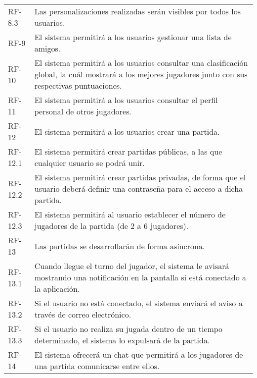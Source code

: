 \documentclass[11pt, a4paper, titlepage]{article}
\begin{document}
\begin{longtable}
\begin{tabularx}{\textwidth}{|l|X|}
         RF-8.3 & Las personalizaciones realizadas serán visibles por todos los usuarios.\\
         RF-9 & El sistema permitirá a los usuarios gestionar una lista de amigos.\\
         RF-10 & El sistema permitirá a los usuarios consultar una clasificación global, la cuál mostrará a los mejores jugadores junto con sus respectivas puntuaciones.\\
         RF-11 & El sistema permitirá a los usuarios consultar el perfil personal de otros jugadores.\\
         RF-12 & El sistema permitirá a los usuarios crear una partida.\\
         RF-12.1 & El sistema permitirá crear partidas públicas, a las que cualquier usuario se podrá unir.\\
         RF-12.2 & El sistema permitirá crear partidas privadas, de forma que el usuario deberá definir una contraseña para el acceso a dicha partida.\\
         RF-12.3 & El sistema permitirá al usuario establecer el número de jugadores de la partida (de 2 a 6 jugadores).\\
         RF-13 & Las partidas se desarrollarán de forma asíncrona.\\
         RF-13.1 & Cuando llegue el turno del jugador, el sistema le avisará mostrando una notificación en la pantalla si está conectado a la aplicación.\\
         RF-13.2 & Si el usuario no está conectado, el sistema enviará el aviso a través de correo electrónico.\\
         RF-13.3 & Si el usuario no realiza su jugada dentro de un tiempo determinado, el sistema lo expulsará de la partida.\\
         RF-14 & El sistema ofrecerá un chat que permitirá a los jugadores de una partida comunicarse entre ellos.\\
         \hline
    \end{tabularx}
    \caption{Requisitos funcionales de la aplicación.}
    \label{tab:rf}
\end{longtable}
\end{document}

